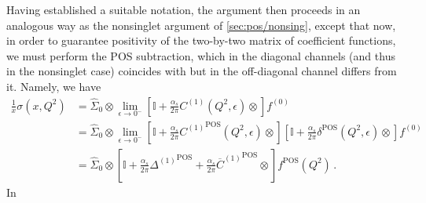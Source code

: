 Having established a suitable notation, the argument then proceeds
in an analogous way as the nonsinglet argument of
\cref{sec:pos/nonsing}, except that now, in order to guarantee
positivity of the two-by-two matrix of coefficient functions, we must
perform the POS subtraction, which in the diagonal
channels (and thus in the nonsinglet case) coincides with \msbar{} but
in the off-diagonal channel differs from it.
Namely, we have
\begin{align}
\frac{1}{x} \sigma(x,Q^2)&= \hat \Sigma_0\otimes
\lim_{\epsilon\to
  0^-}\left[\mathbb{I}
    +\frac{\alpha_s}{2\pi} C^{(1)}(Q^2,\epsilon) \otimes\right]
    f^{(0)} \label{eq:pos/posmsbar} \\
&= \hat \Sigma_0\otimes
\lim_{\epsilon\to
  0^-}\left[\mathbb{I}
  +\frac{\alpha_s}{2\pi} {C^{(1)}}^{{\textrm{POS}}}(Q^2,\epsilon) \otimes\right]
\left[\mathbb{I}
    +\frac{\alpha_s}{2\pi} \delta^{{\textrm{POS}}} (Q^2,\epsilon)\otimes\right]
    f^{(0)} \label{eq:pos/posmsbar1} \\
    &=  \hat \Sigma_0\otimes
\left[\mathbb{I}+ \frac{\alpha_s}{2\pi} {\Delta^{(1)}}^{{\textrm{POS}}}
  +\frac{\alpha_s}{2\pi}    {\overline{C}^{(1)}}^{{\textrm{POS}}} \otimes
  \right] 
     f^{{\textrm{POS}}}(Q^2) \,. \label{eq:pos/posmsbar2}
\end{align}
In 
